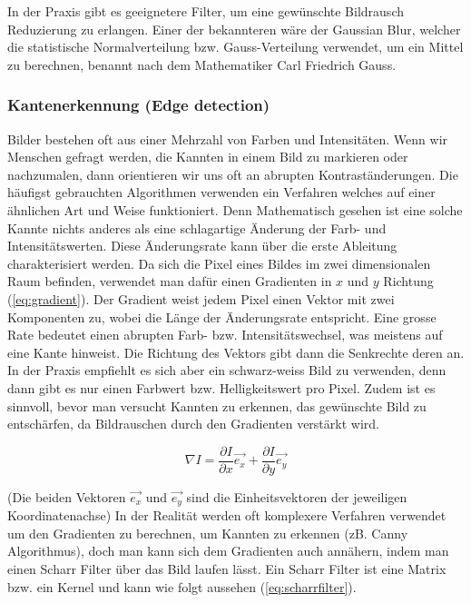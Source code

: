 In der Praxis gibt es geeignetere Filter, um eine gewünschte Bildrausch Reduzierung zu erlangen. Einer der bekannteren wäre der Gaussian Blur, welcher die statistische Normalverteilung bzw. Gauss-Verteilung verwendet, um ein Mittel zu berechnen, benannt nach dem Mathematiker Carl Friedrich Gauss. \cite{carlfriedrichgauss:1}

\subsubsection{Kantenerkennung (Edge detection)}
\label{subsec:kanntenerkennung}

Bilder bestehen oft aus einer Mehrzahl von Farben und Intensitäten. Wenn wir Menschen gefragt werden, die Kannten in einem Bild zu markieren oder nachzumalen, dann orientieren wir uns oft an abrupten Kontraständerungen. Die häufigst gebrauchten Algorithmen verwenden ein Verfahren welches auf einer ähnlichen Art und Weise funktioniert. Denn Mathematisch gesehen ist eine solche Kannte nichts anderes als eine schlagartige Änderung der Farb- und Intensitätswerten. Diese Änderungsrate kann über die erste Ableitung charakterisiert werden. Da sich die Pixel eines Bildes im zwei dimensionalen Raum befinden, verwendet man dafür einen Gradienten in $x$ und $y$ Richtung (\ref{eq:gradient}). Der Gradient weist jedem Pixel einen Vektor mit zwei Komponenten zu, wobei die Länge der Änderungsrate entspricht. Eine grosse Rate bedeutet einen abrupten Farb- bzw. Intensitätswechsel, was meistens auf eine Kante hinweist. Die Richtung des Vektors gibt dann die Senkrechte deren an. In der Praxis empfiehlt es sich aber ein schwarz-weiss Bild zu verwenden, denn dann gibt es nur einen Farbwert bzw. Helligkeitswert pro Pixel. Zudem ist es sinnvoll, bevor man versucht Kannten zu erkennen, das gewünschte Bild zu entschärfen, da Bildrauschen durch den Gradienten verstärkt wird. \cite{computervision_szeliski:2}

\begin{equation}
	\nabla I = \frac{\partial I}{\partial x} \vec{e_{x}} + \frac{\partial I}{\partial y} \vec{e_{y}}
	\label{eq:gradient}
\end{equation}
\cite{computervision_szeliski:2}

(Die beiden Vektoren $\vec{e_x}$ und $\vec{e_y}$ sind die Einheitsvektoren der jeweiligen Koordinatenachse) In der Realität werden oft komplexere Verfahren verwendet um den Gradienten zu berechnen, um Kannten zu erkennen (zB. Canny Algorithmus), doch man kann sich dem Gradienten auch annähern, indem man einen Scharr Filter über das Bild laufen lässt. Ein Scharr Filter ist eine Matrix bzw. ein Kernel und kann wie folgt aussehen (\ref{eq:scharrfilter}). \cite{computervision_szeliski:2}

